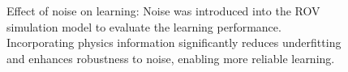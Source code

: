 \documentclass[conference]{IEEEtran}
\begin{document}
{%
\begin{figure}[!t]
    \centering
    
    \caption{Effect of noise on learning: Noise was introduced into the ROV simulation model to evaluate the learning performance. Incorporating physics information significantly reduces underfitting and enhances robustness to noise, enabling more reliable learning.}
    \label{fig:noise}
\end{figure}



% 

}
\end{document}
